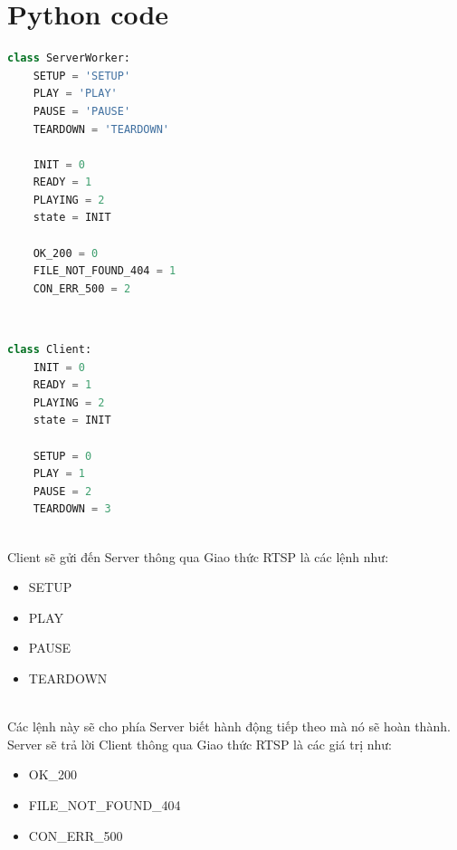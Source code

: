 \documentclass[a4paper]{article}
\begin{document}
\section{Python code}

\begin{lstlisting}[language=Python]
class ServerWorker:
    SETUP = 'SETUP'
    PLAY = 'PLAY'
    PAUSE = 'PAUSE'
    TEARDOWN = 'TEARDOWN'
    
    INIT = 0
    READY = 1
    PLAYING = 2
    state = INIT
	
	OK_200 = 0
    FILE_NOT_FOUND_404 = 1
    CON_ERR_500 = 2
\end{lstlisting}
\\
\begin{lstlisting}[language=Python]
class Client:
    INIT = 0
    READY = 1
    PLAYING = 2
    state = INIT
    
    SETUP = 0
    PLAY = 1
    PAUSE = 2
    TEARDOWN = 3
\end{lstlisting}
\\
\tab Client sẽ gửi đến Server thông qua Giao thức RTSP là các lệnh như:
\begin{itemize}
    \item SETUP
    \item PLAY
    \item PAUSE
    \item TEARDOWN
\end{itemize}
\\
\tab Các lệnh này sẽ cho phía Server biết hành động tiếp theo mà nó sẽ hoàn thành.
\tab Server sẽ trả lời Client thông qua Giao thức RTSP là các giá trị như:
\begin{itemize}
    \item OK\_200
    \item FILE\_NOT\_FOUND\_404
    \item CON\_ERR\_500
\end{itemize}
\\
\end{document}
